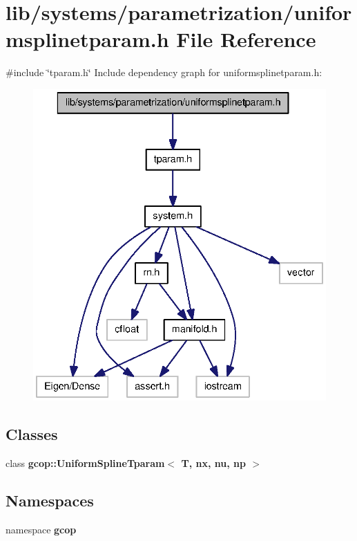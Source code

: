 \section{lib/systems/parametrization/uniformsplinetparam.h \-File \-Reference}
\label{uniformsplinetparam_8h}
{\ttfamily \#include \char`\"{}tparam.\-h\char`\"{}}\*
\-Include dependency graph for uniformsplinetparam.\-h\-:
\nopagebreak
\begin{figure}[H]
\begin{center}
\leavevmode
\includegraphics[width=336pt]{uniformsplinetparam_8h__incl}
\end{center}
\end{figure}
\subsection*{\-Classes}
\begin{DoxyCompactItemize}
\item 
class {\bf gcop\-::\-Uniform\-Spline\-Tparam$<$ T, nx, nu, np $>$}
\end{DoxyCompactItemize}
\subsection*{\-Namespaces}
\begin{DoxyCompactItemize}
\item 
namespace {\bf gcop}
\end{DoxyCompactItemize}
